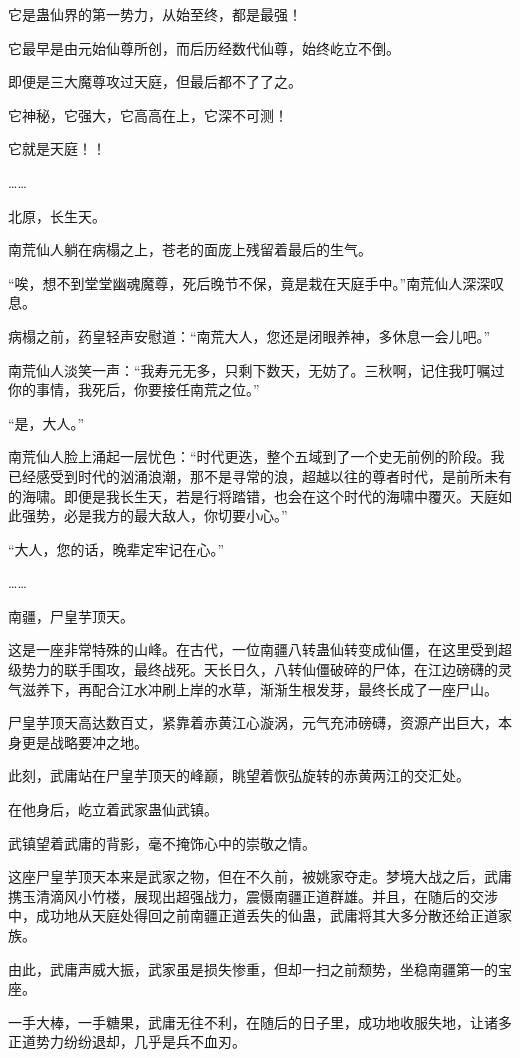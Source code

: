 \begin{this_body}
它是蛊仙界的第一势力，从始至终，都是最强！

它最早是由元始仙尊所创，而后历经数代仙尊，始终屹立不倒。

即便是三大魔尊攻过天庭，但最后都不了了之。

它神秘，它强大，它高高在上，它深不可测！

它就是天庭！！

……

北原，长生天。

南荒仙人躺在病榻之上，苍老的面庞上残留着最后的生气。

“唉，想不到堂堂幽魂魔尊，死后晚节不保，竟是栽在天庭手中。”南荒仙人深深叹息。

病榻之前，药皇轻声安慰道：“南荒大人，您还是闭眼养神，多休息一会儿吧。”

南荒仙人淡笑一声：“我寿元无多，只剩下数天，无妨了。三秋啊，记住我叮嘱过你的事情，我死后，你要接任南荒之位。”

“是，大人。”

南荒仙人脸上涌起一层忧色：“时代更迭，整个五域到了一个史无前例的阶段。我已经感受到时代的汹涌浪潮，那不是寻常的浪，超越以往的尊者时代，是前所未有的海啸。即便是我长生天，若是行将踏错，也会在这个时代的海啸中覆灭。天庭如此强势，必是我方的最大敌人，你切要小心。”

“大人，您的话，晚辈定牢记在心。”

……

南疆，尸皇芋顶天。

这是一座非常特殊的山峰。在古代，一位南疆八转蛊仙转变成仙僵，在这里受到超级势力的联手围攻，最终战死。天长日久，八转仙僵破碎的尸体，在江边磅礴的灵气滋养下，再配合江水冲刷上岸的水草，渐渐生根发芽，最终长成了一座尸山。

尸皇芋顶天高达数百丈，紧靠着赤黄江心漩涡，元气充沛磅礴，资源产出巨大，本身更是战略要冲之地。

此刻，武庸站在尸皇芋顶天的峰巅，眺望着恢弘旋转的赤黄两江的交汇处。

在他身后，屹立着武家蛊仙武镇。

武镇望着武庸的背影，毫不掩饰心中的崇敬之情。

这座尸皇芋顶天本来是武家之物，但在不久前，被姚家夺走。梦境大战之后，武庸携玉清滴风小竹楼，展现出超强战力，震慑南疆正道群雄。并且，在随后的交涉中，成功地从天庭处得回之前南疆正道丢失的仙蛊，武庸将其大多分散还给正道家族。

由此，武庸声威大振，武家虽是损失惨重，但却一扫之前颓势，坐稳南疆第一的宝座。

一手大棒，一手糖果，武庸无往不利，在随后的日子里，成功地收服失地，让诸多正道势力纷纷退却，几乎是兵不血刃。


\end{this_body}
